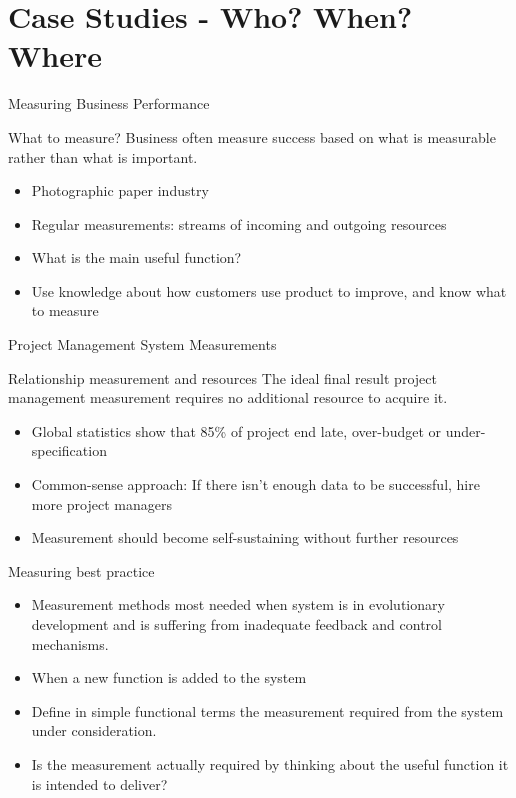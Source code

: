 \documentclass{beamer}
\begin{document}
	
	\section{Case Studies - Who? When? Where}
	
	\begin{frame}{Measuring Business Performance}
		\begin{block}{What to measure?}
			Business often measure success based on what is measurable rather than what is important.
		\end{block}
		
		\begin{itemize}
			\item Photographic paper industry
			\item Regular measurements: streams of incoming and outgoing resources
			\item What is the main useful function?
			\item Use knowledge about how customers use product to improve, and know what to measure
		\end{itemize}

	\end{frame}

	\begin{frame}{Project Management System Measurements}
		\begin{block}{Relationship measurement and resources}
			The ideal final result project management measurement requires no additional resource to acquire it.
		\end{block}
		
		
		\begin{itemize}
			\item Global statistics show that 85\% of project end late, over-budget or under-specification
			\item Common-sense approach: If there isn't enough data to be successful, hire more project managers
			\item Measurement should become self-sustaining without further resources
		\end{itemize}
	\end{frame}


	\begin{frame}{Measuring best practice}
		\begin{itemize}
			\item Measurement methods most needed when system is in evolutionary development and is suffering from inadequate feedback and control mechanisms.
			\item When a new function is added to the system
			\item Define in simple functional terms the measurement required from the system under consideration.
			\item Is the measurement actually required by thinking about the useful
			function it is intended to deliver?
		\end{itemize}
	\end{frame}
	
	
	
\end{document}
